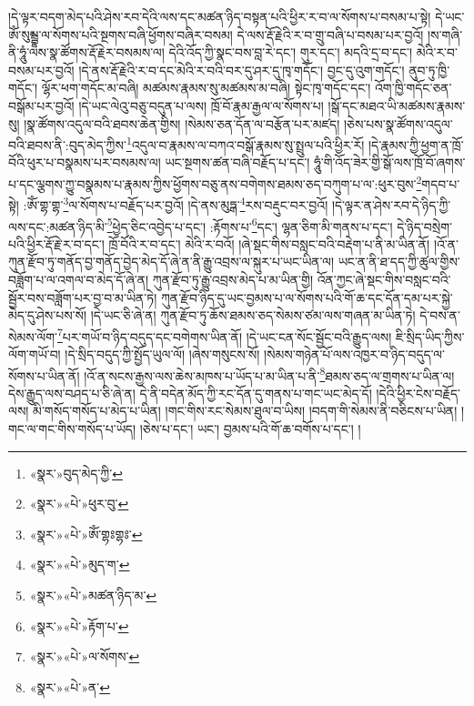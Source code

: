 །དེ་ལྟར་བདག་མེད་པའི་ཤེས་རབ་དེའི་ལས་དང་མཚན་ཉིད་བསྟན་པའི་ཕྱིར་ར་བ་ལ་སོགས་པ་བསམ་པ་སྟེ། དེ་ཡང་ཨོཾ་སུམྦྷ་ལ་སོགས་པའི་སྔགས་བཞི་ཕྱོགས་བཞིར་བསམ། དེ་ལས་རྡོ་རྗེའི་ར་བ་གྲུ་བཞི་པ་བསམ་པར་བྱའོ། །ས་གཞི་ནི་ཧཱུཾ་ལས་སྣ་ཚོགས་རྡོ་རྗེར་བསམས་ལ། དེའི་འོད་ཀྱི་སྣང་བས་བླ་རེ་དང་། གུར་དང་། མདའི་དྲ་བ་དང་། མེའི་ར་བ་བསམ་པར་བྱའོ། །དེ་ནས་རྡོ་རྗེའི་ར་བ་དང་མེའི་ར་བའི་བར་དུ་ཤར་དུ་ཁྭ་གདོང་། བྱང་དུ་འུག་གདོང་། ནུབ་ཏུ་ཁྱི་གདོང་། ལྷོར་ཕག་གདོང་མ་བཞི། མཚམས་རྣམས་སུ་མཚམས་མ་བཞི། སྟེང་ཁྭ་གདོང་དང་། འོག་ཁྱི་གདོང་ཅན་བསྒོམ་པར་བྱའོ། །དེ་ཡང་ལེའུ་བཅུ་བདུན་པ་ལས། ཁྲོ་བོ་རྣམ་རྒྱལ་ལ་སོགས་པ། །སྒོ་དང་མཐའ་ཡི་མཚམས་རྣམས་སུ། །སྣ་ཚོགས་འདུལ་བའི་ཐབས་ཆེན་གྱིས། །སེམས་ཅན་དོན་ལ་བརྩོན་པར་མཛད། །ཅེས་པས་སྣ་ཚོགས་འདུལ་བའི་ཐབས་ནི་:བུད་མེད་ཀྱིས་\footnote{«སྣར་»བུད་མེད་ཀྱི་}འདུལ་བ་རྣམས་ལ་བཀའ་བསྒོ་རྣམས་སུ་སྤྲུལ་པའི་ཕྱིར་རོ། །དེ་རྣམས་ཀྱི་ཕྱག་ན་ཁྲོ་བོའི་ཕུར་པ་བསྣམས་པར་བསམས་ལ། ཡང་སྔགས་ཚན་བཞི་བརྗོད་པ་དང་། ཧཱུཾ་གི་འོད་ཟེར་གྱི་སྒོ་ལས་ཁྲོ་བོ་ཞགས་པ་དང་ལྕགས་ཀྱུ་བསྣམས་པ་རྣམས་ཀྱིས་ཕྱོགས་བཅུ་ནས་བགེགས་ཐམས་ཅད་བཀུག་པ་ལ་:ཕུར་བུས་\footnote{«སྣར་»«པེ་»ཕུར་བུ་}གདབ་པ་སྟེ། :ཨོཾ་གྷ་གྷ་\footnote{«སྣར་»«པེ་»ཨོཾ་གྷཿགྷཿ་}ལ་སོགས་པ་བརྗོད་པར་བྱའོ། །དེ་ནས་མུཏྒ་\footnote{«སྣར་»«པེ་»མུད་ག་}རས་བརྡུང་བར་བྱའོ། །དེ་ལྟར་ན་ཤེས་རབ་དེ་ཉིད་ཀྱི་ལས་དང་:མཚན་ཉིད་མི་\footnote{«སྣར་»«པེ་»མཚན་ཉིད་མ་}ཕྱེད་ཅིང་འབྱེད་པ་དང་། :རྟོགས་པ་\footnote{«སྣར་»«པེ་»རྟོག་པ་}དང་། ལྷན་ཅིག་མི་གནས་པ་དང་། དེ་ཉིད་བསྲེག་པའི་ཕྱིར་རྡོ་རྗེ་ར་བ་དང་། ཁྲོ་བོའི་ར་བ་དང་། མེའི་ར་བའོ། །ཞེ་སྡང་གིས་བསླང་བའི་བརྡེག་པ་ནི་མ་ཡིན་ནོ། །འོ་ན་ཀུན་རྫོབ་ཏུ་གནོད་བྱ་གནོད་བྱེད་མེད་དོ་ཞེ་ན་ནི་རྒྱུ་འབྲས་ལ་སྐུར་པ་ཡང་ཡིན་ལ། ཡང་ན་ནི་ཐ་དད་ཀྱི་ཚུལ་གྱིས་བཟློག་པ་ལ་འགལ་བ་མེད་དོ་ཞེ་ན། ཀུན་རྫོབ་ཏུ་རྒྱུ་འབྲས་མེད་པ་མ་ཡིན་གྱི། འོན་ཀྱང་ཞེ་སྡང་གིས་བསླང་བའི་སྦྱོར་བས་བཟློག་པར་བྱ་བ་མ་ཡིན་ཏེ། ཀུན་རྫོབ་ཉིད་དུ་ཡང་བྱམས་པ་ལ་སོགས་པའི་གོ་ཆ་དང་དོན་དམ་པར་སྐྱེ་མེད་དུ་ཤེས་པས་སོ། །དེ་ཡང་ཅི་ཞེ་ན། ཀུན་རྫོབ་ཏུ་ཆོས་ཐམས་ཅད་སེམས་ཙམ་ལས་གཞན་མ་ཡིན་ཏེ། དེ་བས་ན་སེམས་ལོག་\footnote{«སྣར་»«པེ་»ལ་སོགས་}པར་གཡོ་བ་ཉིད་བདུད་དང་བགེགས་ཡིན་ནོ། །དེ་ཡང་ངན་སོང་སྦྱོང་བའི་རྒྱུད་ལས། ཇི་སྲིད་ཡིད་ཀྱིས་ལོག་གཡོ་བ། །དེ་སྲིད་བདུད་ཀྱི་སྤྱོད་ཡུལ་ལོ། །ཞེས་གསུངས་སོ། །སེམས་གཉེན་པོ་ལས་འཁྱར་བ་ཉིད་བདུད་ལ་སོགས་པ་ཡིན་ནོ། །འོ་ན་སངས་རྒྱས་ལས་ཆེས་མཁས་པ་ཡོད་པ་མ་ཡིན་པ་ནི་\footnote{«སྣར་»«པེ་»ན་}ཐམས་ཅད་ལ་གྲགས་པ་ཡིན་ལ། དེས་རྒྱུད་ལས་བཤད་པ་ཅི་ཞེ་ན། དེ་ནི་བདེན་མོད་ཀྱི་རང་དོན་དུ་གནས་པ་གང་ཡང་མེད་དོ། །དེའི་ཕྱིར་ངེས་བརྗོད་ལས། མི་གསོད་གསོད་པ་མེད་པ་ཡིན། །གང་གིས་རང་སེམས་ཐུལ་བ་ཡིས། །བདག་གི་སེམས་ནི་བཅིངས་པ་ཡིན། །གང་ལ་གང་གིས་གསོད་པ་ཡོད། །ཅེས་པ་དང་། ཡང་། བྱམས་པའི་གོ་ཆ་བགོས་པ་དང་། །
